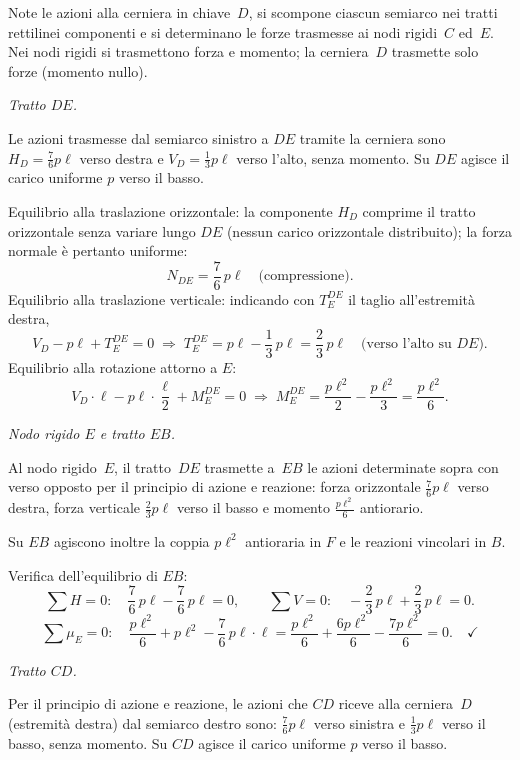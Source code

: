 Note le azioni alla cerniera in chiave~$D$, si scompone ciascun
semiarco nei tratti rettilinei componenti e si determinano le
forze trasmesse ai nodi rigidi~$C$ ed~$E$.
Nei nodi rigidi si trasmettono forza e momento; la cerniera~$D$
trasmette solo forze (momento nullo).

\medskip
\noindent\textit{Tratto $DE$.}

Le azioni trasmesse dal semiarco sinistro a $DE$ tramite la
cerniera sono $H_D = \tfrac{7}{6}p\ell$ verso destra
e $V_D = \tfrac{1}{3}p\ell$ verso l'alto, senza momento.
Su $DE$ agisce il carico uniforme $p$ verso il basso.

Equilibrio alla traslazione orizzontale:
la componente $H_D$ comprime il tratto orizzontale senza
variare lungo $DE$ (nessun carico orizzontale distribuito);
la forza normale è pertanto uniforme:
\[
N_{DE} = \frac{7}{6}\,p\ell \quad\text{(compressione).}
\]
Equilibrio alla traslazione verticale: indicando con
$T_E^{DE}$ il taglio all'estremità destra,
\[
V_D - p\ell + T_E^{DE} = 0
\;\Rightarrow\;
T_E^{DE} = p\ell - \frac{1}{3}\,p\ell = \frac{2}{3}\,p\ell
\quad\text{(verso l'alto su }DE\text{).}
\]
Equilibrio alla rotazione attorno a $E$:
\[
V_D\cdot\ell - p\ell\cdot\frac{\ell}{2} + M_E^{DE} = 0
\;\Rightarrow\;
M_E^{DE} = \frac{p\ell^2}{2} - \frac{p\ell^2}{3}
= \frac{p\ell^2}{6}.
\]

\medskip
\noindent\textit{Nodo rigido $E$ e tratto $EB$.}

Al nodo rigido~$E$, il tratto~$DE$ trasmette a~$EB$ le azioni
determinate sopra con verso opposto per il principio di azione
e reazione:
forza orizzontale $\tfrac{7}{6}p\ell$ verso destra,
forza verticale $\tfrac{2}{3}p\ell$ verso il basso
e momento $\tfrac{p\ell^2}{6}$ antiorario.

Su $EB$ agiscono inoltre la coppia $p\ell^2$ antioraria in $F$
e le reazioni vincolari in $B$.

\noindent Verifica dell'equilibrio di $EB$:
\[
\sum H = 0:\quad
\frac{7}{6}\,p\ell - \frac{7}{6}\,p\ell = 0,
\qquad
\sum V = 0:\quad
-\frac{2}{3}\,p\ell + \frac{2}{3}\,p\ell = 0.
\]
\[
\sum \mu_E = 0:\quad
\frac{p\ell^2}{6}
+ p\ell^2
- \frac{7}{6}\,p\ell\cdot\ell
= \frac{p\ell^2}{6} + \frac{6p\ell^2}{6} - \frac{7p\ell^2}{6}
= 0.\quad\checkmark
\]

\medskip
\noindent\textit{Tratto $CD$.}

Per il principio di azione e reazione, le azioni che $CD$ riceve
alla cerniera~$D$ (estremità destra) dal semiarco destro sono:
$\tfrac{7}{6}p\ell$ verso sinistra e $\tfrac{1}{3}p\ell$
verso il basso, senza momento.
Su $CD$ agisce il carico uniforme $p$ verso il basso.


